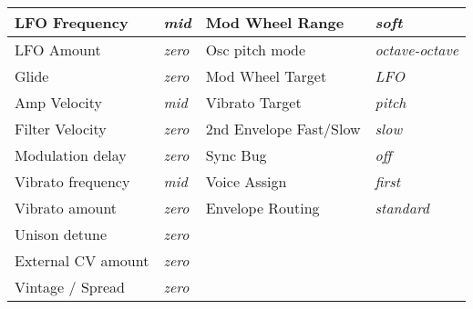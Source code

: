 \begin{longtable}[l]{p{5cm}|p{5cm}|p{5cm}|p{5cm}|}
LFO Frequency & \textit{mid} & Mod Wheel Range & \textit{soft} \\ \hline
LFO Amount & \textit{zero} & Osc pitch mode & \textit{octave-octave} \\ \hline
Glide & \textit{zero} & Mod Wheel Target & \textit{LFO} \\ \hline
Amp Velocity & \textit{mid} & Vibrato Target & \textit{pitch} \\ \hline
Filter Velocity & \textit{zero} & 2nd Envelope Fast/Slow & \textit{slow} \\ \hline
Modulation delay & \textit{zero} & Sync Bug & \textit{off} \\ \hline
Vibrato frequency & \textit{mid} & Voice Assign & \textit{first} \\ \hline
Vibrato amount & \textit{zero} & Envelope Routing & \textit{standard} \\ \hline
Unison detune & \textit{zero} & &  \\ \hline
External CV amount & \textit{zero} &  &  \\ \hline
Vintage / Spread & \textit{zero} &  &  \\ \hline 
\end{longtable}
